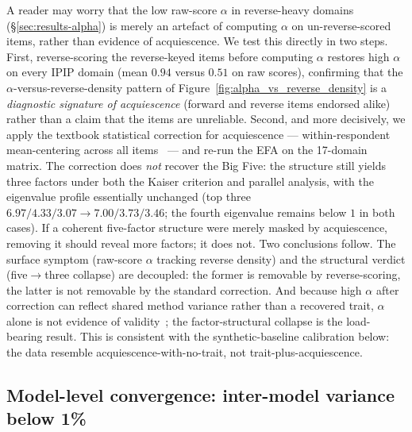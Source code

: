 \documentclass[11pt]{article}
\begin{document}
A reader may worry that the low raw-score $\alpha$ in reverse-heavy domains (\S\ref{sec:results-alpha}) is merely an artefact of computing $\alpha$ on un-reverse-scored items, rather than evidence of acquiescence. We test this directly in two steps. First, reverse-scoring the reverse-keyed items before computing $\alpha$ restores high $\alpha$ on every IPIP domain (mean $0.94$ versus $0.51$ on raw scores), confirming that the $\alpha$-versus-reverse-density pattern of Figure~\ref{fig:alpha_vs_reverse_density} is a \emph{diagnostic signature of acquiescence} (forward and reverse items endorsed alike) rather than a claim that the items are unreliable. Second, and more decisively, we apply the textbook statistical correction for acquiescence --- within-respondent mean-centering across all items~\citep{couch1960yeasayers} --- and re-run the EFA on the 17-domain matrix. The correction does \emph{not} recover the Big Five: the structure still yields three factors under both the Kaiser criterion and parallel analysis, with the eigenvalue profile essentially unchanged (top three $6.97/4.33/3.07 \to 7.00/3.73/3.46$; the fourth eigenvalue remains below $1$ in both cases). If a coherent five-factor structure were merely masked by acquiescence, removing it should reveal more factors; it does not. Two conclusions follow. The surface symptom (raw-score $\alpha$ tracking reverse density) and the structural verdict (five$\to$three collapse) are decoupled: the former is removable by reverse-scoring, the latter is not removable by the standard correction. And because high $\alpha$ after correction can reflect shared method variance rather than a recovered trait, $\alpha$ alone is not evidence of validity~\citep{cronbach1951coefficient}; the factor-structural collapse is the load-bearing result. This is consistent with the synthetic-baseline calibration below: the data resemble acquiescence-with-no-trait, not trait-plus-acquiescence.

\subsection{Model-level convergence: inter-model variance below 1\%}
\label{sec:results-variance}
\end{document}
